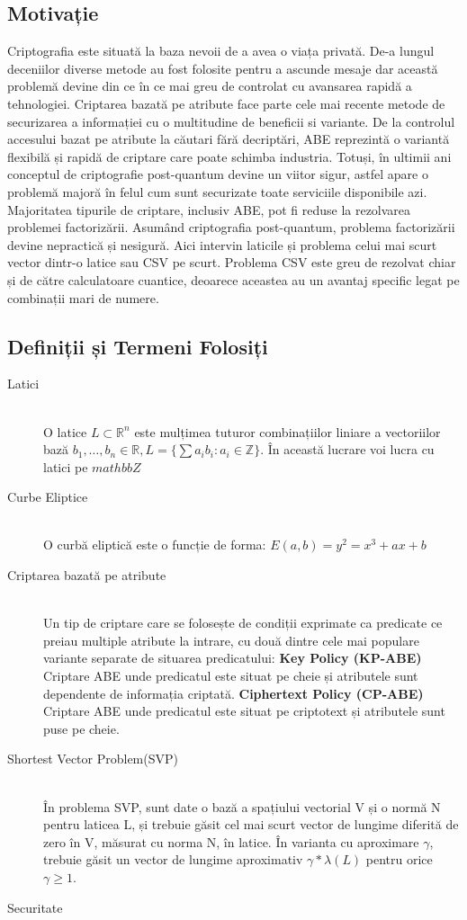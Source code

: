 \documentclass{article}
\begin{document}
\subsection{Motivație}
Criptografia este situată la baza nevoii de a avea o viața privată. De-a lungul deceniilor diverse metode au fost folosite pentru a ascunde mesaje dar această problemă devine din ce în ce mai greu de controlat cu avansarea rapidă a tehnologiei. Criptarea bazată pe atribute face parte cele mai recente metode de securizarea a informației cu o multitudine de beneficii si variante.
De la controlul accesului bazat pe atribute la căutari fără decriptări, ABE reprezintă o variantă flexibilă și rapidă de criptare care poate schimba industria. Totuși, în ultimii ani conceptul de criptografie post-quantum devine un viitor sigur, astfel apare o problemă majoră în felul cum sunt securizate toate serviciile disponibile azi. Majoritatea tipurile de criptare, inclusiv ABE, pot fi reduse la rezolvarea problemei factorizării. Asumând criptografia post-quantum, problema factorizării devine nepractică și nesigură. Aici intervin laticile și problema celui mai scurt vector dintr-o latice sau CSV pe scurt. Problema CSV este greu de rezolvat chiar și de către calculatoare cuantice, deoarece aceastea au un avantaj specific legat pe combinații mari de numere.
\subsection{Definiții și Termeni Folosiți}
\begin{description}
  \item[Latici] \hfill \\ O latice $ L \subset \mathbb{R}^n $ este mulțimea tuturor combinațiilor liniare a vectoriilor bază $b_1,\dots, b_n \in \mathbb{R}, L = \{\sum{a_i b_i}:a_i \in \mathbb{Z}\}$. În această lucrare voi lucra cu latici pe $mathbb{Z}$
  \item[Curbe Eliptice] \hfill \\ O curbă eliptică este o funcție de forma: $E(a, b) = y^2 = x^3 + ax + b$
  \item[Criptarea bazată pe atribute] \hfill \\ Un tip de criptare care se folosește de condiții exprimate ca predicate ce preiau multiple atribute la intrare, cu două dintre cele mai populare variante separate de situarea predicatului:
  \subitem \textbf{Key Policy (KP-ABE)} Criptare ABE unde predicatul este situat pe cheie și atributele sunt dependente de informația criptată. 
  \subitem \textbf{Ciphertext Policy (CP-ABE)} Criptare ABE unde predicatul este situat pe criptotext și atributele sunt puse pe cheie.
  \item[Shortest Vector Problem(SVP)] \hfill \\ În problema SVP, sunt date o bază a spațiului vectorial V și o normă N pentru laticea L, și trebuie găsit cel mai scurt vector de lungime diferită de zero în V, măsurat cu norma N, în latice. În varianta cu aproximare $\gamma$, trebuie găsit un vector de lungime aproximativ $\gamma * \lambda(L)$ pentru orice $\gamma \geq 1$.
  \item[Securitate] 
\end{description}
\end{document}
